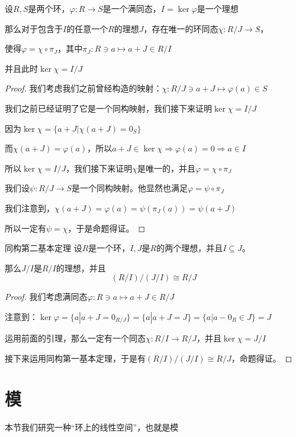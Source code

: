 \documentclass[12pt, a4paper, oneside, UTF8]{ctexbook}
\begin{document}
			\begin{lemma}{}{}
				设$R,S$是两个环，$\varphi : R \rightarrow S$是一个满同态，$I=\ker \varphi$是一个理想

				那么对于包含于$I$的任意一个$R$的理想$J$，存在唯一的环同态$\chi : R/J \rightarrow S$，
				
				使得$\varphi =\chi \circ \pi_J$，其中$\pi_J : R \ni a \mapsto a+J \in R/I$

				并且此时$\ker \chi =I/J$
			\end{lemma}
			\begin{proof}
				我们考虑我们之前曾经构造的映射：$\chi : R / J \ni a+J \mapsto \varphi (a) \in S$

				我们之前已经证明了它是一个同构映射，我们接下来证明$\ker \chi = I/J$

				因为$\ker \chi =\{a+J | \chi (a+J)=0_S\}$

				而$\chi (a+J)=\varphi (a)$，所以$a+J \in \ker \chi \Rightarrow \varphi (a)=0 \Rightarrow a\in I$

				所以$\ker \chi = I/J$，我们接下来证明$\chi $是唯一的，并且$\varphi =\chi \circ \pi_J$

				我们设$\psi : R/J \rightarrow S$是一个同构映射。他显然也满足$\varphi =\psi \circ \pi_J$

				我们注意到，$\chi(a+J)=\varphi (a)=\psi \left(\pi_{J}(a)\right)=\psi(a+J)$
				
				所以一定有$\psi =\chi $，于是命题得证。
			\end{proof}
			\begin{them}{同构第二基本定理}{}
				设$R$是一个环，$I,J$是$R$的两个理想，并且$I \subseteq J$。

				那么$J/I$是$R/I$的理想，并且
				\begin{equation}
					(R/I)/(J/I) \cong R/J
				\end{equation}
			\end{them}
			\begin{proof}
				我们考虑满同态$\varphi : R \ni a \mapsto a+J \in R/J$

				注意到：$\ker \varphi =\{a|a+J=0_{R/J}\}=\{a|a+J=J\}=\{a|a-0_R \in J\}=J$

				运用前面的引理，那么一定有一个同态$\chi : R/I \rightarrow R/J$，并且$\ker \chi =J/I$

				接下来运用同构第一基本定理，于是有$(R/I)/(J/I) \cong R/J$，命题得证。
			\end{proof}
	\section{模}
		本节我们研究一种“环上的线性空间”，也就是模
\end{document}
